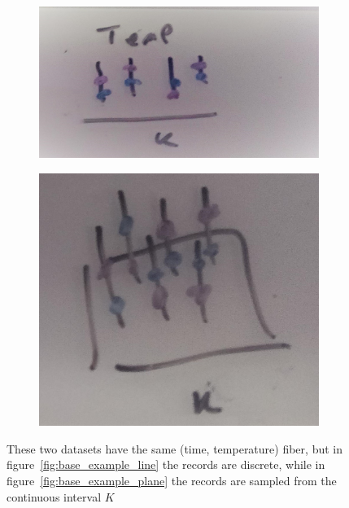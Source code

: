 \documentclass[../main.tex]{subfiles}
\begin{document}
\begin{figure}[ht!]
    \begin{subfigure}{.5\textwidth}
        \includegraphics[width=\textwidth]{figures/math/temp_1k.png}
        \caption{}
        \label{fig:base_example_discrete}
    \end{subfigure}
    \begin{subfigure}{.5\textwidth}
        \includegraphics[width=\textwidth]{figures/math/temp_2k.png}
        \caption{}
        \label{fig:base_example_continuous}
    \end{subfigure}
    \caption{These two datasets have the same (time, temperature) fiber, but in figure~\ref{fig:base_example_line} the records are discrete, while in figure~\ref{fig:base_example_plane} the records are sampled from the continuous interval $K$
    }
    \label{fig:base_example}
\end{figure}
\end{document}
